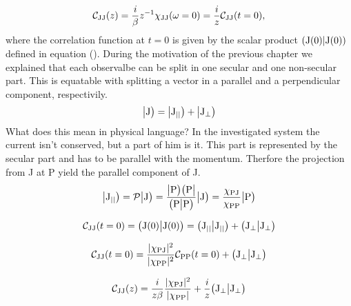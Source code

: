 %
\begin{align}
	\mathcal{C}_{\mathrm{JJ}}(z) = \frac{i}{\beta} z^{-1} \chi_{\mathrm{JJ}}(\omega=0) = \frac{i}{z} \mathcal{C}_{\mathrm{JJ}}(t=0),
\end{align}
%
where the correlation function at $t = 0$ is given by the scalar product $({\mathrm{J}(0)}|{\mathrm{J}(0)})$ defined in equation ().
During the motivation of the previous chapter we explained that each observalbe can be split in one secular and one non-secular part.
This is equatable with splitting a vector in a parallel and a perpendicular component, respectivily.
%
\begin{align}
	\big|{\mathrm{J}}\big) = \big|{\mathrm{J}_{\mid\mid}}\big) + \big|{\mathrm{J}_{\bot}}\big)
\end{align}
%
What does this mean in physical language?
In the investigated system the current isn't conserved, but a part of him is it.
This part is represented by the secular part and has to be parallel with the momentum.
Therfore the projection from J at P yield the parallel component of J.
%
\begin{align}
	\big|{\mathrm{J}_{\mid\mid}}\big) = \mathcal{P}\big|{\mathrm{J}}\big) = \frac{\big|{\mathrm{P}}\big)\big({\mathrm{P}}\big|}{\big({\mathrm{P}}\big|{\mathrm{P}}\big)} \big|{\mathrm{J}}\big) = \frac{\chi_{\mathrm{PJ}}}{\chi_{\mathrm{PP}}} \big|{\mathrm{P}}\big)
\end{align}
%

%
\begin{align}
	\mathcal{C}_{\mathrm{JJ}}(t=0) = \big({\mathrm{J}(0)}\big|{\mathrm{J}(0)}\big) = \big({\mathrm{J}_{\mid\mid}}\big|{\mathrm{J}_{\mid\mid}}\big) + \big({\mathrm{J}_{\bot}}\big|{\mathrm{J}_{\bot}}\big)
\end{align}
%

%
\begin{align}
	\mathcal{C}_{\mathrm{JJ}}(t=0) = \frac{\vert\chi_{\mathrm{PJ}}\vert^{2}}{\vert\chi_{\mathrm{PP}}\vert^{2}} \mathcal{C}_{\mathrm{PP}}(t=0) + \big({\mathrm{J}_{\bot}}\big|{\mathrm{J}_{\bot}}\big)
\end{align}
%

%
\begin{align}
	\mathcal{C}_{\mathrm{JJ}}(z) = \frac{i}{z \beta} \frac{\vert\chi_{\mathrm{PJ}}\vert^{2}}{\vert\chi_{\mathrm{PP}}\vert} + \frac{i}{z} \big({\mathrm{J}_{\bot}}\big|{\mathrm{J}_{\bot}}\big)
\end{align}
%

